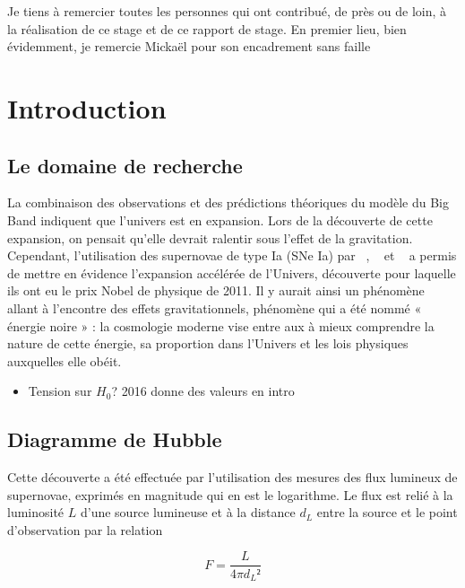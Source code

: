 \documentclass[a4paper, 12pt, svgnames]{article}
\begin{document}

Je tiens à remercier toutes les personnes qui ont contribué, de près ou de loin,
à la réalisation de ce stage et de ce rapport de stage. En premier lieu, bien
évidemment, je remercie Mickaël  pour son encadrement sans faille

\tableofcontents
\newpage

\section{Introduction}\label{sec:int}
\subsection{Le domaine de recherche}

La combinaison des observations et des prédictions théoriques du modèle du Big
Band indiquent que l'univers est en expansion. Lors de la découverte de cette
expansion, on pensait qu'elle devrait ralentir sous l'effet de la gravitation.
Cependant, l'utilisation des supernovae de type Ia (SNe Ia) par ~\cite{perlmutter_measurements_1999}, 
~\cite{riess_observational_1998} et 
~\cite{schmidt_high-z_1998} a permis de mettre en évidence l'expansion
accélérée de l'Univers, découverte pour laquelle ils ont eu le prix Nobel de
physique de 2011. Il y aurait ainsi un phénomène allant à l'encontre des
effets gravitationnels, phénomène qui a été nommé « énergie noire » : la
cosmologie moderne vise entre aux à mieux comprendre la nature de cette énergie,
sa proportion dans l'Univers et les lois physiques auxquelles elle obéit.

\begin{itemize}
    \item Tension sur $H_0$?  2016 donne des valeurs en intro
\end{itemize}

\subsection{Diagramme de Hubble}
Cette découverte a été effectuée par l'utilisation des mesures des flux lumineux
de supernovae, exprimés en magnitude qui en est le logarithme. Le flux est relié
à la luminosité $L$ d'une source lumineuse et à la distance $d_L$ entre la source
et le point d'observation par la relation

\begin{equation}
    F = \frac{L}{4\pi d_L²}
\end{equation}
\end{document}
